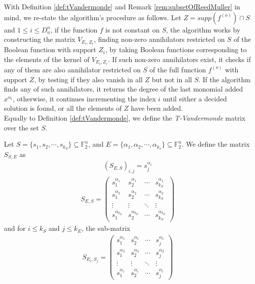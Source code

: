 \documentclass[11pt]{llncs}
\begin{document}
With Definition \ref{def:tVandermonde} and Remark \ref{rem:subsetOfReedMuller} in mind, we re-state the algorithm's procedure as follows. Let $Z = supp\left(f^{(o)}\right) \cap S$ and $1\leq i \leq D_n^n$, if the function $f$ is not constant on $S$, the algorithm works by constructing the matrix $V_{E_i, Z_i}$, finding non-zero annihilators restricted on $S$ of the Boolean function with support $Z_i$, by taking Boolean functions corresponding to the elements of the kernel of $V_{E_i, Z_i}$. If such non-zero annihilators exist, it checks if any of them are also annihilator restricted on $S$ of the full function $f^{(o)}$ with support $Z$, by testing if they also vanish in all $Z$ but not in all $S$. If the algorithm finds any of such annihilators, it returns the degree of the last monomial added $x^{\alpha_i}$, otherwise, it continues incrementing the index $i$ until either a decided solution is found, or all the elements of $Z$ have been added.\\

Equally to Definition \ref{def:tVandermonde}, we define the \textit{T-Vandermonde} matrix over the set $S$.
\begin{definition}
    Let $S = \{s_1, s_2, \cdots, s_{k_S}\} \subseteq \mathbb{F}_2^n$, and $E = \{\alpha_1, \alpha_2, \cdots, \alpha_{k_s}\} \subseteq \mathbb{F}_2^n$. We define the matrix $S_{S,E}$ as
    \begin{align*}
        \left(S_{E,S}\right)_{i,j} = s_j^{\alpha_i}
    \end{align*}
    \begin{align*}
        S_{E,S} = 
        \begin{pmatrix}
            s_1^{\alpha_1} & s_2^{\alpha_1} & \cdots & s_{k_S}^{\alpha_1} \\
            s_1^{\alpha_2} & s_2^{\alpha_2} & \cdots & s_{k_S}^{\alpha_2} \\
            \vdots & \vdots & \ddots & \vdots \\
            s_1^{\alpha_{k_E}} & s_{2}^{\alpha_{k_E}} & \cdots & s_{k_S}^{\alpha_{k_E}}
        \end{pmatrix}
    \end{align*}
    and for $i \leq k_S$ and $j\leq k_E$, the sub-matrix
    \begin{align*}
    S_{E_i, S_j} = 
    \begin{pmatrix}
            s_1^{\alpha_1} & s_2^{\alpha_1} & \cdots & s_{j}^{\alpha_1} \\
            s_1^{\alpha_2} & s_2^{\alpha_2} & \cdots & s_{j}^{\alpha_2} \\
            \vdots & \vdots & \ddots & \vdots \\
            s_1^{\alpha_{i}} & s_{2}^{\alpha_{i}} & \cdots & s_{j}^{\alpha_{i}}
        \end{pmatrix}    
    \end{align*}
\end{definition}
\end{document}
